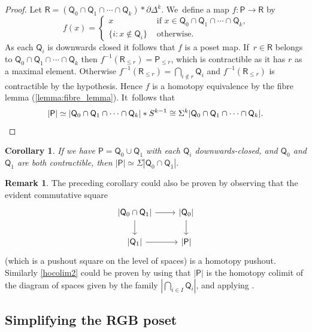 \documentclass[11pt]{article}
\theoremstyle{plain}
\newtheorem{cor}[thm]{Corollary}
\theoremstyle{definition}
\newtheorem{rem}[thm]{Remark}
\newcommand{\Po}{\mathsf{P}}
\begin{document}
\begin{proof}
Let $\mathsf{R}=(\mathsf Q_0 \cap \mathsf Q_1\cap \cdots \cap \mathsf Q_k) \ast \partial \mathsf \Delta^{k}$. We~define a map
$ f\colon \mathsf P \to \mathsf{R}$ by
\[
f(x)= \begin{cases} x & \text{ if $x\in \mathsf Q_0 \cap \mathsf Q_1\cap \cdots \cap \mathsf Q_k$,}\\
\{ i : x \not\in \mathsf Q_i \} & \text{ otherwise. } \end{cases}
\]
As each $\mathsf Q_i$ is downwards closed it follows that $f$ is a poset map. If~$r \in \mathsf R$ belongs to $\mathsf Q_0\cap \mathsf Q_1 \cap \cdots \cap \mathsf Q_k$ then $f^{-1}(\mathsf R_{\leq r})=\Po_{\leq r}$, which is contractible as it has $r$ as a maximal element. Otherwise $f^{-1}(\mathsf R_{\leq r})=\bigcap_{i \not\in r} \mathsf Q_i$ and $f^{-1}(\mathsf R_{\leq r})$ is contractible by the hypothesis. Hence $f$ is a homotopy equivalence by the fibre lemma (\ref{lemma:fibre_lemma}). It~follows that
\[
|\mathsf P| \simeq |\mathsf Q_0 \cap \mathsf Q_1\cap \cdots \cap \mathsf Q_k| \ast S^{k-1} \cong \Sigma^{k}|\mathsf Q_0 \cap \mathsf Q_1\cap \cdots \cap \mathsf Q_k|. \qedhere
\]
\end{proof}

\begin{cor}\label{hocolim1}If we have $\mathsf P = \mathsf Q_0 \cup \mathsf Q_1$ with each $\mathsf Q_i$ downwards-closed, and $\mathsf Q_0$ and $\mathsf Q_1$ are both contractible, then $|\mathsf P| \simeq \Sigma |\mathsf Q_0 \cap \mathsf Q_1|.$
\end{cor}

\begin{rem}
The preceding corollary could also be proven by observing that the evident commutative square
\[
\begin{tikzcd}
\vert\mathsf Q_0 \cap \mathsf Q_1\vert \arrow[r]\arrow[d]& \vert\mathsf Q_0 \vert\arrow[d] \\
\vert\mathsf Q_1\vert \arrow[r]& \vert\mathsf P\vert
\end{tikzcd}
\]
(which is a pushout square on the level of spaces) is a homotopy pushout. Similarly \cref{hocolim2} could be proven by using that $|\mathsf P|$ is the homotopy colimit of the diagram of spaces given by the family $|\bigcap_{i \in I}\mathsf Q_i |$, and applying \cite[Ex.\,5.7.5]{munson-volic}.\end{rem}

\subsection{Simplifying the RGB poset}
\end{document}
